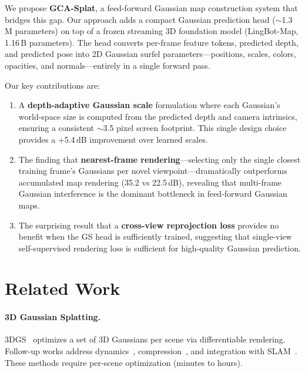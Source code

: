 \documentclass[10pt,twocolumn]{article}
\begin{document}
We propose \textbf{GCA-Splat}, a feed-forward Gaussian map construction system that bridges this gap.
Our approach adds a compact Gaussian prediction head (${\sim}$1.3\,M parameters) on top of a frozen streaming 3D foundation model (LingBot-Map, 1.16\,B parameters).
The head converts per-frame feature tokens, predicted depth, and predicted pose into 2D Gaussian surfel parameters---positions, scales, colors, opacities, and normals---entirely in a single forward pass.

Our key contributions are:
\begin{enumerate}
    \item A \textbf{depth-adaptive Gaussian scale} formulation where each Gaussian's world-space size is computed from the predicted depth and camera intrinsics, ensuring a consistent ${\sim}$3.5 pixel screen footprint. This single design choice provides a +5.4\,dB improvement over learned scales.

    \item The finding that \textbf{nearest-frame rendering}---selecting only the single closest training frame's Gaussians per novel viewpoint---dramatically outperforms accumulated map rendering (35.2 vs 22.5\,dB), revealing that multi-frame Gaussian interference is the dominant bottleneck in feed-forward Gaussian maps.

    \item The surprising result that a \textbf{cross-view reprojection loss} provides no benefit when the GS head is sufficiently trained, suggesting that single-view self-supervised rendering loss is sufficient for high-quality Gaussian prediction.
\end{enumerate}

\section{Related Work}
\label{sec:related}

\paragraph{3D Gaussian Splatting.}
3DGS~\cite{kerbl3dgs} optimizes a set of 3D Gaussians per scene via differentiable rendering.
Follow-up works address dynamics~\cite{dynamic3dgs}, compression~\cite{compact3dgs}, and integration with SLAM~\cite{splatam,monogs}.
These methods require per-scene optimization (minutes to hours).
\end{document}
